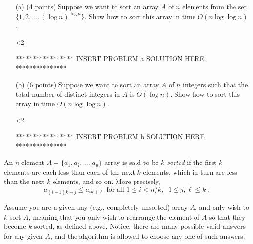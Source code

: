 
\ifnum{}
%
\fi
\ifnum{}
\fi
\ifnum{}
\fi


\begin{itemize}
\item[(a)] (4 points) Suppose we want to sort an array $A$ of $n$
  elements from the set $\{1, 2, \ldots, (\log n)^{\log n}\}$.
  Show how to sort this array in time $O(n \log \log n)$.

\ifnum\me<2
\begin{solution}
***************** INSERT PROBLEM \prob a SOLUTION HERE ***************
\end{solution}
\fi

\item[(b)] (6 points) Suppose we want to sort an array $A$ of $n$
  integers such that the total number of distinct integers in $A$ is
  $O(\log n)$. Show how to sort this array in time $O(n \log \log n)$.

\ifnum\me<2
\begin{solution}
***************** INSERT PROBLEM \prob b SOLUTION HERE ***************
\end{solution}
\fi

\end{itemize}


An $n$-element $A = \{a_1, a_2, \ldots, a_n\}$ array is said to be
{\em $k$-sorted} if the first $k$ elements are each less than each of
the next $k$ elements, which in turn are less than the next $k$
elements, and so on.  More precisely, $$a_{(i-1)k + j} \leq a_{ik +
  \ell} \text{ for all }1\leq i < n/k, \;\; 1 \leq j, \ell \leq k\;.$$

Assume you are a given any (e.g., completely unsorted) array $A$, and
only wish to $k$-sort $A$, meaning that you only wish to rearrange the
element of $A$ so that they become $k$-sorted, as defined above.
Notice, there are many possible valid answers for any given $A$, and
the algorithm is allowed to choose any one of such answers.

